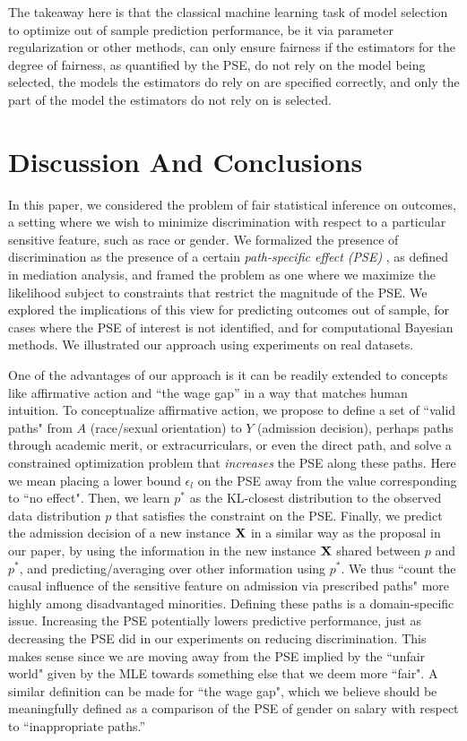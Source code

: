 \documentclass[letterpaper]{article} %
\newcommand{\citep}{\cite}
\begin{document}
The takeaway here is that the classical machine learning task of model selection to optimize out of sample prediction performance, be it via parameter regularization or other methods, can only ensure fairness if the estimators for the degree of fairness, as quantified by the PSE, do not rely on the model being selected, the models the estimators do rely on are specified correctly, and only the part of the model the estimators do not rely on is selected.

\section{Discussion And Conclusions}
\label{sec:discussion}
In this paper, we considered the problem of fair statistical inference on outcomes, a setting where we wish to minimize discrimination with respect to a particular sensitive feature, such as race or gender.  We formalized the presence of discrimination as the presence of a certain \emph{path-specific effect (PSE)} \citep{pearl01direct,shpitser13cogsci}, as defined in mediation analysis, and framed the problem as one where we maximize the likelihood subject to constraints that restrict the magnitude of the PSE.  We explored the implications of this view for predicting outcomes out of sample, for cases where the PSE of interest is not identified, and for computational Bayesian methods. We illustrated our approach using experiments on real datasets. 

One of the advantages of our approach is it can be readily extended to concepts like affirmative action and ``the wage gap'' in a way that matches human intuition. To conceptualize affirmative action, we propose to define a set of ``valid paths" from $A$ (race/sexual orientation) to $Y$ (admission decision), perhaps paths through academic merit, or extracurriculars, or even the direct path, and solve a constrained optimization problem that \emph{increases} the PSE along these paths. Here we mean placing a lower bound $\epsilon_l$ on the PSE away from the value corresponding to ``no effect".  Then, we learn $p^*$ as the KL-closest distribution to the observed data distribution $p$ that satisfies the constraint on the PSE.  Finally, we predict the admission decision of a new instance $\bf X$ in a similar way as the proposal in our paper, by using the information in the new instance $\bf X$ shared between $p$ and $p^*$, and predicting/averaging over other information using $p^*$. We thus ``count the causal influence of the sensitive feature on admission via prescribed paths" more highly among disadvantaged minorities.  Defining these paths is a domain-specific issue. Increasing the PSE potentially lowers predictive performance, just as decreasing the PSE did in our experiments on reducing discrimination.  This makes sense since we are moving away from the PSE implied by the ``unfair world" given by the MLE towards something else that we deem more ``fair".  A similar definition can be made for ``the wage gap", which we believe should be meaningfully defined as a comparison of the PSE of gender on salary with respect to ``inappropriate paths.''
\end{document}
